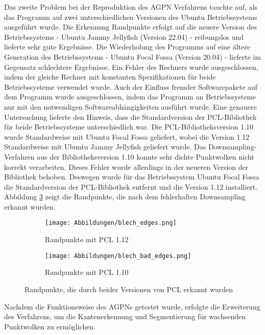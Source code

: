 Das zweite Problem bei der Reproduktion des AGPN Verfahrens tauchte auf, als das Programm auf zwei unterschiedlichen Versionen des Ubuntu Betriebssystems ausgeführt wurde. Die Erkennung Randpunkte erfolgt auf die neuere Version des Betriebssystems - Ubuntu Jammy Jellyfish (Version 22.04) - reibungslos und lieferte sehr gute Ergebnisse. Die Wiederholung des Programms auf eine ältere Generation des Betriebssystems - Ubuntu Focal Fossa (Version 20.04) - lieferte im Gegensatz schlechtere Ergebnisse. Ein Fehler des Rechners wurde ausgeschlossen, indem der gleiche Rechner mit konstanten Spezifikationen für beide Betriebssysteme verwendet wurde. Auch der Einfluss fremder Softwarepakete auf dem Programm wurde ausgeschlossen, indem das Programm an Betriebssysteme nur mit den notwendigen Softwareabhängigkeiten ausführt wurde. Eine genauere Untersuchung lieferte den Hinweis, dass die Standardversion der PCL-Bibliothek für beide Betriebssysteme unterschiedlich war. Die PCL-Bibliotheksversion 1.10 wurde Standardweise mit Ubuntu Focal Fossa geliefert, wobei die Version 1.12 Standardweise mit Ubuntu Jammy Jellyfish geliefert wurde. Das Downsampling-Verfahren aus der Bibliotheksversion 1.10 konnte sehr dichte Punktwolken nicht korrekt verarbeiten. Dieses Fehler wurde allerdings in der neueren Version der Bibliothek behoben. Deswegen wurde für das Betriebssystem Ubuntu Focal Fossa die Standardversion der PCL-Bibliothek entfernt und die Version 1.12 installiert. Abbildung \ref{fig: pcl_version_comparision} zeigt die Randpunkte, die nach dem fehlerhaften Downsampling erkannt wurden.

\begin{figure}[h]
	\centering
	\begin{subfigure}[h]{0.95\textwidth}
		\texttt{[image: Abbildungen/blech\_edges.png]}
		\centering
		\caption{Randpunkte mit PCL 1.12}
		\label{fig: blech_edges}
	\end{subfigure}
	\hfill
	\begin{subfigure}[h]{0.95\textwidth}
		\texttt{[image: Abbildungen/blech\_bad\_edges.png]}
		\centering
		\caption{Randpunkte mit PCL 1.10}
		\label{fig: bad_edges}
	\end{subfigure}
	\caption{Randpunkte, die durch beider Versionen von PCL erkannt wurden}
	\label{fig: pcl_version_comparision}
\end{figure}

Nachdem die Funktionsweise des AGPNs getestet wurde, erfolgte die Erweiterung des Verfahrens, um die Kantenerkennung und Segmentierung für wachsenden Punktwolken zu ermöglichen.

